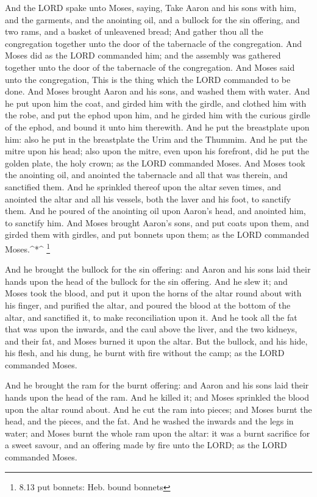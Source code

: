  And the LORD spake unto Moses, saying,  Take
Aaron and his sons with him, and the garments, and the anointing oil,
and a bullock for the sin offering, and two rams, and a basket of
unleavened bread;  And gather thou all the congregation
together unto the door of the tabernacle of the congregation.
 And Moses did as the LORD commanded him; and the assembly
was gathered together unto the door of the tabernacle of the
congregation.  And Moses said unto the congregation, This is
the thing which the LORD commanded to be done.  And Moses
brought Aaron and his sons, and washed them with water.  And
he put upon him the coat, and girded him with the girdle, and clothed
him with the robe, and put the ephod upon him, and he girded him with
the curious girdle of the ephod, and bound it unto him therewith.
 And he put the breastplate upon him: also he put in the
breastplate the Urim and the Thummim.  And he put the mitre
upon his head; also upon the mitre, even upon his forefront, did he put
the golden plate, the holy crown; as the LORD commanded Moses.
 And Moses took the anointing oil, and anointed the
tabernacle and all that was therein, and sanctified them. 
And he sprinkled thereof upon the altar seven times, and anointed the
altar and all his vessels, both the laver and his foot, to sanctify
them.  And he poured of the anointing oil upon Aaron's
head, and anointed him, to sanctify him.  And Moses brought
Aaron's sons, and put coats upon them, and girded them with girdles, and
put bonnets upon them; as the LORD commanded Moses.\^{}*\^{} \footnote{8.13
  put bonnets: Heb. bound bonnets}

 And he brought the bullock for the sin offering: and Aaron
and his sons laid their hands upon the head of the bullock for the sin
offering.  And he slew it; and Moses took the blood, and
put it upon the horns of the altar round about with his finger, and
purified the altar, and poured the blood at the bottom of the altar, and
sanctified it, to make reconciliation upon it.  And he took
all the fat that was upon the inwards, and the caul above the liver, and
the two kidneys, and their fat, and Moses burned it upon the altar.
 But the bullock, and his hide, his flesh, and his dung, he
burnt with fire without the camp; as the LORD commanded Moses.

 And he brought the ram for the burnt offering: and Aaron
and his sons laid their hands upon the head of the ram. 
And he killed it; and Moses sprinkled the blood upon the altar round
about.  And he cut the ram into pieces; and Moses burnt the
head, and the pieces, and the fat.  And he washed the
inwards and the legs in water; and Moses burnt the whole ram upon the
altar: it was a burnt sacrifice for a sweet savour, and an offering made
by fire unto the LORD; as the LORD commanded Moses.

